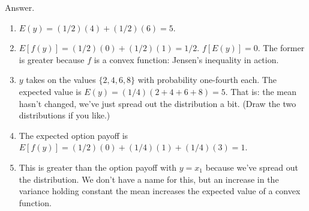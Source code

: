 \documentclass[11pt]{article}
\begin{document}
\begin{enumerate}
Answer.
\begin{enumerate}
\item $E(y) = (1/2) (4) + (1/2) (6) = 5$.
\item $E[f(y)] = (1/2) (0) + (1/2) (1) = 1/2 $.
$f[E(y)] = 0 $.
The former is greater because $f$ is a convex function:
Jensen's inequality in action.
\item $y$ takes on the values $\{2, 4, 6, 8\}$ with probability
one-fourth each.
The expected value is $ E(y) = (1/4) (2 + 4 + 6 + 8) = 5$.
That is:  the mean hasn't changed, we've just spread out the distribution a bit.
(Draw the two distributions if you like.)
\item The expected option payoff is
$ E[f(y)] = (1/2) (0) + (1/4) (1) + (1/4) (3) = 1$.
\item This is greater than the option payoff with $ y = x_1$ because
we've spread out the distribution.
We don't have a name for this,
but an increase in the variance holding constant
the mean increases the expected value of a convex function.
\end{enumerate}


\end{enumerate}
\end{document}
